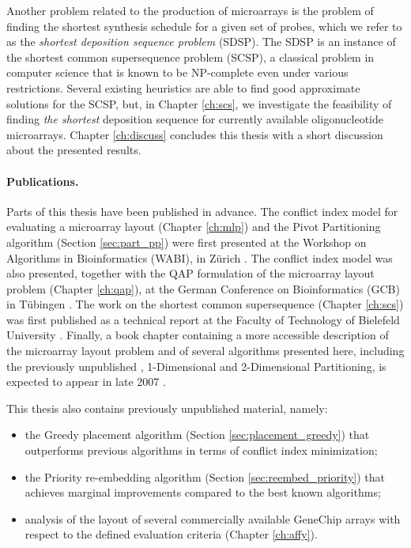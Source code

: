 Another problem related to the production of microarrays is the problem of
finding the shortest synthesis schedule for a given set of probes, which we
refer to as the \emph{shortest deposition sequence problem} (SDSP). The SDSP is
an instance of the shortest common supersequence problem (SCSP), a classical
problem in computer science that is known to be NP-complete even under various
restrictions. Several existing heuristics are able to find good approximate
solutions for the SCSP, but, in Chapter \ref{ch:scs}, we investigate the
feasibility of finding \emph{the shortest} deposition sequence for currently
available oligonucleotide microarrays. Chapter \ref{ch:discuss} concludes this
thesis with a short discussion about the presented results.

\paragraph{Publications.}
Parts of this thesis have been published in advance. The conflict index model
for evaluating a microarray layout (Chapter \ref{ch:mlp}) and the Pivot
Partitioning algorithm (Section \ref{sec:part_pp}) were first presented at the
Workshop on Algorithms in Bioinformatics (WABI), in Z\"urich
\citep{Carvalho2006}. The conflict index model was also presented, together with
the QAP formulation of the microarray layout problem (Chapter \ref{ch:qap}), at
the German Conference on Bioinformatics (GCB) in T\"ubingen
\citep{Carvalho2006a}. The work on the shortest common supersequence (Chapter
\ref{ch:scs}) was first published as a technical report at the Faculty of
Technology of Bielefeld University \citep{Carvalho2005}. Finally, a book chapter
containing a more accessible description of the microarray layout problem and of
several algorithms presented here, including the previously unpublished
\Greedyplus, 1-Dimensional and 2-Dimensional Partitioning, is expected to appear
in late 2007 \citep{Carvalho2007}.

This thesis also contains previously unpublished material, namely:
\begin{itemize}
\item the Greedy placement algorithm (Section \ref{sec:placement_greedy}) that
      outperforms previous algorithms in terms of conflict index minimization;
\item the Priority re-embedding algorithm (Section \ref{sec:reembed_priority})
      that achieves marginal improvements compared to the best known algorithms;
\item analysis of the layout of several commercially available GeneChip arrays
      with respect to the defined evaluation criteria (Chapter \ref{ch:affy}).
\end{itemize}

